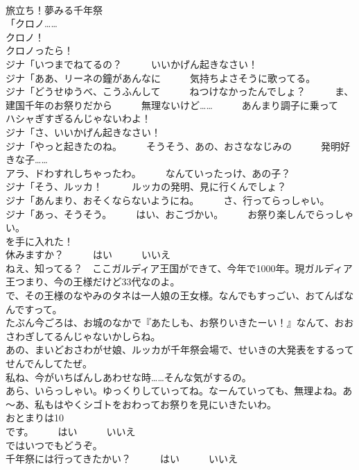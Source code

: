 \documentclass[8pt]{extreport}
\begin{document}
\begin{CJK}{UTF8}{min}
\\	旅立ち！夢みる千年祭	
\\	「クロノ……	
\\	クロノ！	
\\	クロノったら！	
\\	ジナ「いつまでねてるの？　　　いいかげん起きなさい！	
\\	ジナ「ああ、リーネの鐘があんなに　　　気持ちよさそうに歌ってる。	
\\	ジナ「どうせゆうべ、こうふんして　　　ねつけなかったんでしょ？　　　ま、建国千年のお祭りだから　　　無理ないけど……　　　あんまり調子に乗って　　　ハシャぎすぎるんじゃないわよ！	
\\	ジナ「さ、いいかげん起きなさい！	
\\	ジナ「やっと起きたのね。　　　そうそう、あの、おさななじみの　　　発明好きな子……	
\\	アラ、ドわすれしちゃったわ。　　　なんていったっけ、あの子？	
\\	ジナ「そう、ルッカ！　　　ルッカの発明、見に行くんでしょ？	
\\	ジナ「あんまり、おそくならないようにね。　　　さ、行ってらっしゃい。	
\\	ジナ「あっ、そうそう。　　　はい、おこづかい。　　　お祭り楽しんでらっしゃい。　　　　
\\	を手に入れた！	
\\	休みますか？　　　はい　　　いいえ	
\\	ねえ、知ってる？　ここガルディア王国ができて、今年で1000年。現ガルディア王つまり、今の王様だけど33代なのよ。	
\\	で、その王様のなやみのタネは一人娘の王女様。なんでもすっごい、おてんばなんですって。	
\\	たぶん今ごろは、お城のなかで『あたしも、お祭りいきたーい！』なんて、おおさわぎしてるんじゃないかしらね。	
\\	あの、まいどおさわがせ娘、ルッカが千年祭会場で、せいきの大発表をするってせんでんしてたぜ。	
\\	私ね、今がいちばんしあわせな時……そんな気がするの。	
\\	あら、いらっしゃい。ゆっくりしていってね。なーんていっても、無理よね。あ～あ、私もはやくシゴトをおわってお祭りを見にいきたいわ。	
\\	おとまりは10
\\	です。　　　はい　　　いいえ	
\\	ではいつでもどうぞ。	
\\	千年祭には行ってきたかい？　　　はい　　　いいえ	

\end{CJK}
\end{document}
